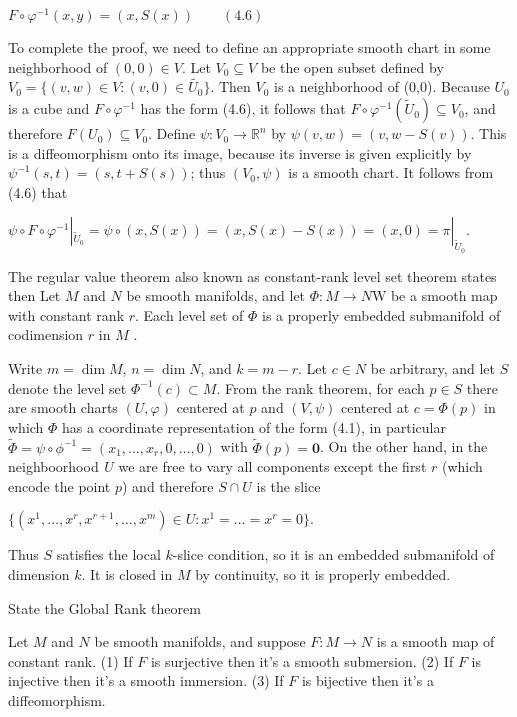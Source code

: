 \(F\circ\varphi^{-1}(x,y)=(x,S(x)) \qquad (4.6)\)

To complete the proof, we need to define an appropriate smooth chart in some neighborhood of \((0,0)\in V\). Let \(V_{0}\subseteq V\) be the open subset defined by \(V_{0}=\{(v,w)\in V:(v,0)\in\tilde{U_{0}}\}\). Then \(V_{0}\) is a neighborhood of (0,0). Because \(U_{0}\) is a cube and \(F\circ\varphi^{-1}\) has the form (4.6), it follows that \(F\circ\varphi^{-1}(\tilde{U}_{0})\subseteq V_{0}\), and therefore \(F(U_{0})\subseteq V_{0}\). Define \(\psi:V_{0}\rightarrow\mathbb{R}^{n}\) by \(\psi(v,w)=(v,w-S(v))\). This is a diffeomorphism onto its image, because its inverse is given explicitly by \(\psi^{-1}(s,t)=(s,t+S(s))\); thus \((V_{0},\psi)\) is a smooth chart. It follows from (4.6) that

\(\psi \circ F \circ \varphi^{-1} |_{\tilde{U}_0} = \psi \circ (x, S(x)) = (x, S(x) - S(x)) = (x, 0) = \pi |_{\tilde{U}_0}.\)


The regular value theorem also known as constant-rank level set theorem states then
Let \( M \) and \( N \) be smooth manifolds, and let \( \Phi : M \to N \)W  be a smooth map with constant rank \( r \). 
Each level set of \( \Phi \) is a properly embedded submanifold of codimension \( r \) in \( M \) .

Write \(m = \dim M\), \(n = \dim N\), and \(k = m - r\). Let \(c \in N\) be arbitrary, and let \(S\) denote the level set \(\Phi^{-1}(c) \subset M\). From the rank theorem, for each \(p \in S\) there are smooth charts \((U, \varphi)\) centered at \(p\) and \((V, \psi)\) centered at \(c = \Phi(p)\) in which \(\Phi\) has a coordinate representation of the form (4.1), in particular \(\tilde{\Phi} = \psi \circ \phi^{-1} = (x_1, \dots, x_r, 0, \dots, 0) \) with \( \tilde{\Phi}(p) = \textbf{0} \). On the other hand, in the neighboorhood  \(U\) we are free to vary all components except the first \(r\) (which encode the point \(p\)) and therefore \(S \cap U\) is the slice   
 
\(\{(x^1, \dots, x^r, x^{r+1}, \dots, x^m) \in U : x^1 = \dots = x^r = 0\}.\)

Thus \(S\) satisfies the local \(k\)-slice condition, so it is an embedded submanifold of dimension \(k\). It is closed in \(M\) by continuity, so it is properly embedded.



State the Global Rank theorem

Let \( M \) and \( N \) be smooth manifolds, and suppose \( F : M \to N \) is a smooth map of constant rank. 
(1) If \( F \) is surjective then it's a smooth submersion. 
(2) If \( F \) is injective then it's a smooth immersion. 
(3) If \( F \) is bijective then it's a diffeomorphism.
